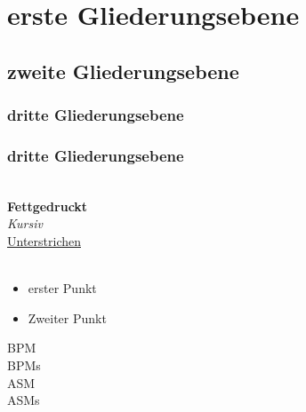
\section{erste Gliederungsebene}		   	%
\subsection{zweite Gliederungsebene}	   	%
\subsubsection{dritte Gliederungsebene}		%
\subsubsection{dritte Gliederungsebene}		%
\label{referenzKey} 					   	%
 				\\ 	%
\textbf{Fettgedruckt}					\\ 	%
\textit{Kursiv}							\\ 	%
\underline{Unterstrichen}				\\ 	%
\\											%
\begin{itemize}								%
	\item erster Punkt						%
	\item Zweiter Punkt						%
\end{itemize}								%
\gls{BPM} 								\\ 	%
\glspl{BPM} 							\\ 	%
\gls{ASM} 								\\ 	%
\glspl{ASM} 							\\ 	%
 							\\ 	%
 						\\ 	%
					\\ 	%
\cite{BiBkey} 							\\ 	%

